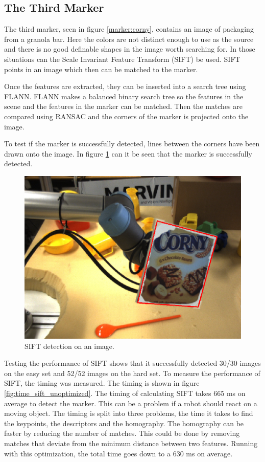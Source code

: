\subsection{The Third Marker}
The third marker, seen in figure \ref{marker:corny}, contains an image of packaging from a granola bar.
Here the colors are not distinct enough to use as the source and there is no good definable shapes in the image worth searching for.
In those situations can the Scale Invariant Feature Transform (SIFT) be used.
SIFT points in an image which then can be matched to the marker.

Once the features are extracted, they can be inserted into a search tree using FLANN.
FLANN makes a balanced binary search tree so the features in the scene and the features in the marker can be matched.
Then the matches are compared using RANSAC and the corners of the marker is projected onto the image. 

To test if the marker is successfully detected, lines between the corners have been drawn onto the image.
In figure \ref{fig:sift_detection} can it be seen that the marker is successfully detected.

\begin{figure}[h]
 \centering
 \includegraphics[width=0.5\linewidth]{graphics/sift_detection}
 \caption{SIFT detection on an image.}
 \label{fig:sift_detection}
\end{figure}

Testing the performance of SIFT shows that it successfully detected 30/30 images on the easy set and 52/52 images on the hard set.
To measure the performance of SIFT, the timing was measured. 
The timing is shown in figure \ref{fig:time_sift_unoptimized}. 
The timing of calculating SIFT takes $665$ ms on average to detect the marker.
This can be a problem if a robot should react on a moving object.
The timing is split into three problems, the time it takes to find the keypoints, the descriptors and the homography.
The homography can be faster by reducing the number of matches.
This could be done by removing matches that deviate from the minimum distance between two features.
Running with this optimization, the total time goes down to a $630$ ms on average.

